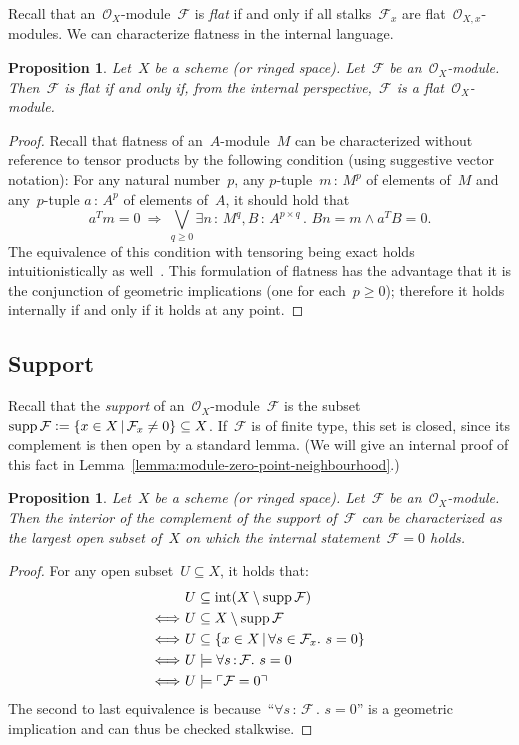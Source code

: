 \documentclass[10pt]{amsart}
\theoremstyle{definition}
\theoremstyle{plain}
\newtheorem{prop}[defn]{Proposition}
\theoremstyle{remark}
\newcommand{\F}{\mathcal{F}}
\renewcommand{\O}{\mathcal{O}}
\DeclareMathOperator{\Int}{int}
\DeclareMathOperator{\supp}{supp}
\newcommand{\?}{\,{:}\,}
\renewcommand{\_}{\mathpunct{.}\,}
\newcommand{\speak}[1]{\ulcorner\text{\textnormal{#1}}\urcorner}
\newcommand{\defeq}{\vcentcolon=}
\begin{document}
Recall that an~$\O_X$-module~$\F$ is \emph{flat} if and only if all
stalks~$\F_x$ are flat~$\O_{X,x}$-modules. We can characterize flatness in the
internal language.
\begin{prop}\label{prop:flatness}
Let~$X$ be a scheme (or ringed space). Let~$\F$ be
an~$\O_X$-module. Then~$\F$ is flat if and only if, from the internal
perspective,~$\F$ is a flat~$\O_X$-module.
\end{prop}
\begin{proof}
Recall that flatness of an~$A$-module~$M$ can be characterized without
reference to tensor products by the following condition (using
suggestive vector notation): For any natural number~$p$,
any $p$-tuple~$m \? M^p$ of elements of~$M$ and
any~$p$-tuple $a \? A^p$ of elements of~$A$, it should hold that
\[
  a^T m = 0 \ \Longrightarrow\
  \bigvee\limits_{q \geq 0} \exists n\?M^q, B\?A^{p \times q}\_
  Bn = m \wedge a^T B = 0. \]
The equivalence of this condition with tensoring being exact holds
intuitionistically as
well~\cite[theorem~III.5.3]{mines-richman-ruitenburg:constructive-algebra}.
This formulation of flatness has the advantage that it is the conjunction of
geometric implications (one for each~$p \geq 0$); therefore it holds internally
if and only if it holds at any point.
\end{proof}


\subsection{Support} Recall that the \emph{support} of an~$\O_X$-module~$\F$ is
the subset~$\supp\F \defeq \{ x \in X \,|\, \F_x \neq 0 \} \subseteq X$. If~$\F$ is
of finite type, this set is closed, since its complement is then open by a
standard lemma. (We will give an internal proof of this fact in
Lemma~\ref{lemma:module-zero-point-neighbourhood}.)

\begin{prop}\label{prop:characterization-support}
Let~$X$ be a scheme (or ringed space). Let~$\F$ be
an~$\O_X$-module. Then the interior of the complement of the support of~$\F$
can be characterized as the largest open subset of~$X$ on which the internal
statement~$\F = 0$ holds.
\end{prop}
\begin{proof}
For any open subset~$U \subseteq X$, it holds that:
\begin{align*}
  &\ U \subseteq \Int(X \setminus \supp \F) \\
  \Longleftrightarrow&\ U \subseteq X \setminus \supp \F \\
  \Longleftrightarrow&\ U \subseteq \{ x \in X \,|\, \forall s \in \F_x\_ s = 0 \} \\
  \Longleftrightarrow&\ U \models \forall s\?\F\_ s = 0 \\
  \Longleftrightarrow&\ U \models \speak{$\F = 0$}
\end{align*}
The second to last equivalence is because~``$\forall s\?\F\_ s = 0$'' is a
geometric implication and can thus be checked stalkwise.
\end{proof}
\end{document}

